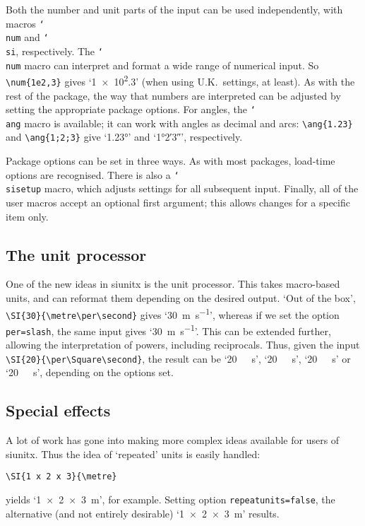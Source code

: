 \documentclass{article}
\providecommand*\cs[1]{\texttt{\char`\\#1}}
\providecommand*\pkg[1]{\textsf{#1}}
\providecommand*\opt[1]{\texttt{#1}}
\begin{document}
Both the number and unit parts of the input can be used
independently, with macros \cs{num} and \cs{si}, respectively.
The \cs{num} macro can interpret and format a wide range of
numerical input.  So \verb|\num{1e2,3}| gives `\num{1e2,3}'
(when using U.K.~settings, at least).  As with the rest of the
package, the way that numbers are interpreted can be adjusted
by setting the appropriate package options.  For angles, the
\cs{ang} macro is available; it can work with angles as decimal
and arcs: \verb|\ang{1.23}| and  \verb|\ang{1;2;3}| give
`\ang{1.23}' and `\ang{1;2;3}', respectively.

Package options can be set in three ways.  As with most
packages, load-time options are recognised.  There is also a
\cs{sisetup} macro, which adjusts settings for all subsequent
input.  Finally, all of the user macros accept an optional
first argument; this allows changes for a specific item only.

\subsection{The unit processor}

One of the new ideas in \pkg{siunitx} is the unit processor.
This takes macro-based units, and can reformat them depending
on the desired output.  `Out of the box',
\verb|\SI{30}{\metre\per\second}| gives
`\SI{30}{\metre\per\second}', whereas if we set the option
\opt{per=slash}, the same input gives
`\SI[per=slash]{30}{\metre\per\second}'. This can be extended
further, allowing the interpretation of powers, including
reciprocals.  Thus, given the input
\verb|\SI{20}{\per\Square\second}|, the result can be
`\SI{20}{\per\Square\second}',
`\SI[per=slash]{20}{\per\Square\second}',
`\SI[per=frac]{20}{\per\Square\second}' or
`\SI[per=frac,fraction=nice]{20}{\per\Square\second}',
depending on the options set.

\subsection{Special effects}

A lot of work has gone into making more complex ideas available
for users of \pkg{siunitx}.  Thus the idea of `repeated'
units is easily handled:
\begin{verbatim}
\SI{1 x 2 x 3}{\metre}
\end{verbatim}
yields `\SI{1x2x3}{\metre}', for example.  Setting option
\opt{repeatunits=false}, the alternative (and not entirely
desirable) `\SI[repeatunits=false]{1x2x3}{\metre}' results.
\end{document}
